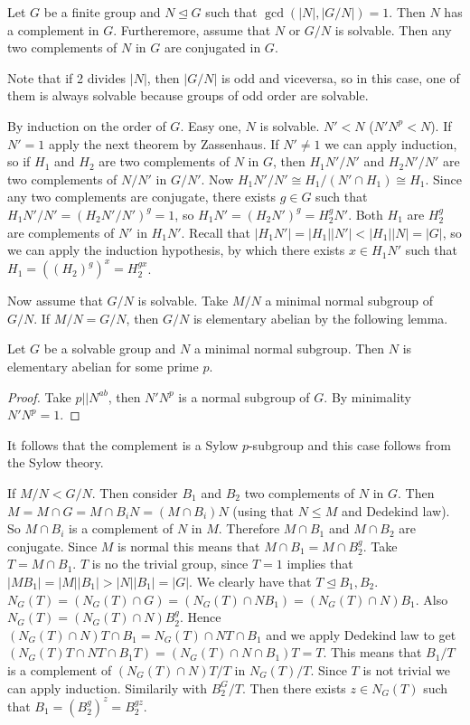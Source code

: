 \documentclass[twoside, 11pt]{article}
\begin{document}
\begin{teorema}
Let $G$ be a finite group and $N\trianglelefteq G$ such that $\gcd(|N|,|G/N|)=1$. Then $N$ has a complement in $G$. Furtheremore, assume that $N$ or $G/N$ is solvable. Then any two complements of $N$ in $G$ are conjugated in $G$.
\end{teorema}

Note that if 2 divides $|N|$, then $|G/N|$ is odd and viceversa, so in this case, one of them is always solvable because groups of odd order are solvable. 

\begin{dem}
By induction on the order of $G$. Easy one, $N$ is solvable. $N'<N$ ($N'N^p<N$). If $N'=1$ apply the next theorem by Zassenhaus. If $N'\neq 1$ we can apply induction, so if $H_1$ and $H_2$ are two complements of $N$ in $G$, then $H_1N'/N'$ and $H_2N'/N'$ are two complements of $N/N'$ in $G/N'$. Now $H_1N'/N'\cong H_1/(N'\cap H_1)\cong H_1$. Since any two complements are conjugate, there exists $g\in G$ such that $H_1N'/N'=(H_2N'/N')^g=1$, so $H_1N'=(H_2N')^g=H_2^gN'$. Both $H_1$ are $H_2^g$ are complements of $N'$ in $H_1N'$. Recall that $|H_1N'|=|H_1||N'|<|H_1||N|=|G|$, so we can apply the induction hypothesis, by which there exists $x\in H_1N'$ such that $H_1=((H_2)^g)^x=H_2^{gx}$. 

Now assume that $G/N$ is solvable. Take $M/N$ a minimal normal subgroup of $G/N$. If $M/N=G/N$, then $G/N$ is elementary abelian by the following lemma.

\begin{lemma}
Let $G$ be a solvable group and $N$ a minimal normal subgroup. Then $N$ is elementary abelian for some prime $p$. 
\end{lemma}
\begin{proof}
Take $p||N^{ab}$, then $N'N^p$ is a normal subgroup of $G$. By minimality $N'N^p=1$. 
\end{proof}

It follows that the complement is a Sylow $p$-subgroup and this case follows from the Sylow theory. 

If $M/N<G/N$. Then consider $B_1$ and $B_2$ two complements of $N$ in $G$. %
Then $M=M\cap G=M\cap B_iN=(M\cap B_i)N$ (using that $N\leq M$ and Dedekind law). So $M\cap B_i$ is a complement of $N$ in $M$. Therefore $M\cap B_1$ and $M\cap B_2$ are conjugate. Since $M$ is normal this means that $M\cap B_1=M\cap B_2^g$. Take $T=M\cap B_1$. $T$ is no the trivial group, since $T=1$ implies that $|MB_1|=|M||B_1|>|N||B_1|=|G|$. We clearly have that $T\trianglelefteq B_1,B_2$. $N_G(T)=(N_G(T)\cap G)=(N_G(T)\cap NB_1)=(N_G(T)\cap N)B_1$. Also $N_G(T)=(N_G(T)\cap N)B_2^g$. Hence $(N_G(T)\cap N)T\cap B_1=N_G(T)\cap NT\cap B_1$ and we apply Dedekind law to get $(N_G(T)T\cap NT\cap B_1T)=(N_G(T)\cap N\cap B_1)T=T$. This means that $B_1/T$ is a complement of $(N_G(T)\cap N)T/T$ in $N_G(T)/T$. Since $T$ is not trivial we can apply induction. Similarily with $B_2^G/T$. Then there exists $z\in N_G(T)$ such that $B_1=(B_2^g)^z=B_2^{gz}$. 
\end{dem}
\end{document}
